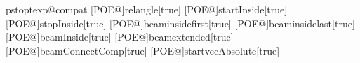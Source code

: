 \def\drawfiber@i[#1]#2#3{%
  \addbefore@par{#1}%
  \begingroup
    \let\psk@angleA\relax
    \let\psk@angleB\relax
    \use@par
    \def\oe@tempa{#2}
    \ifx\oe@tempa\@empty
      \edef\optexp@comps{/\getLastCompname@i\space}
    \else
      \expandafter\optexp@getnode#2\@nil
      \edef\optexp@comps{\oe@temp}
    \fi
    \def\oe@tempb{#3}
    \ifx\oe@tempb\@empty
      \edef\optexp@comps{/\getLastCompname@i\space \optexp@comps}
    \else
      \expandafter\optexp@getnode#3\@nil
      \edef\optexp@comps{\oe@temp\space \optexp@comps}
    \fi
    \ifPOE@bglayer
      \pnode(! \optexp@comps exch \pst@optexpdict NearestNode end \tx@UserCoor){@@A}
      \pnode(! \optexp@comps \pst@optexpdict NearestNode end \tx@UserCoor){@@B}
      \pst@getcoor{@@A}\pst@tempa
      \pst@getcoor{@@B}\pst@tempb
      \ifx\relax\psk@angleA
        \psset{angleA=! \pst@optexpdict \pst@tempb \pst@tempa \optexp@comps exch RelFiberAngle end}%
      \else
        \ifPOE@relangle
          \psset{angleA=! \pst@optexpdict \pst@tempb \pst@tempa \optexp@comps exch RelFiberAngle end \psk@angleA\space add}%
      \fi\fi
      \ifx\psk@angleB\relax
        \psset{angleB=! \pst@optexpdict \pst@tempa \pst@tempb \optexp@comps RelFiberAngle end}%
      \else
        \ifPOE@relangle
          \psset{angleB=! \pst@optexpdict \pst@tempa \pst@tempb \optexp@comps RelFiberAngle end \psk@angleB\space add }%
      \fi\fi
      \nccurve{@@A}{@@B}
    \fi
  \endgroup
}%
%
\expandafter\ifx\csname pstoptexp@compat\endcsname\relax%
%
%
[POE@]{relangle}[true]{}
%
%
%
%
[POE@]{startInside}[true]{}%
[POE@]{stopInside}[true]{}%
[POE@]{beaminsidefirst}[true]{}%
[POE@]{beaminsidelast}[true]{}%
[POE@]{beamInside}[true]{}%
[POE@]{beamextended}[true]{}%
[POE@]{beamConnectComp}[true]{}%
[POE@]{startvecAbsolute}[true]{}%
%
\def\custombeam{\pst@object{custombeam}}%
\def\custombeam@i#1{%
   \ifPOE@bglayer
   \begin@SpecialObj%
   \POE@custombeamtrue
   \def\begin@SpecialObj{%
      \begingroup%
      \use@par%
      \def\end@SpecialObj{\endgroup\ignorespaces}}%
   #1%
   \end@SpecialObj%
   \fi
\ignorespaces}%
